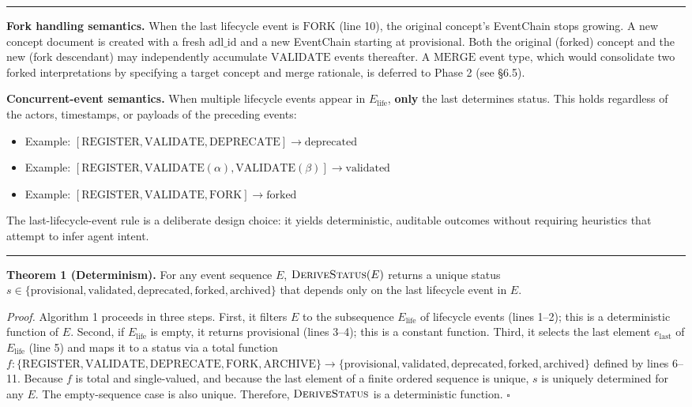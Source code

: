 \begin{center}\rule{0.5\linewidth}{0.5pt}\end{center}

\textbf{Fork handling semantics.} When the last lifecycle event is \(\text{FORK}\) (line 10), the original concept's EventChain stops growing. A new concept document is created with a fresh \(\text{adl\_id}\) and a new EventChain starting at \(\text{provisional}\). Both the original (forked) concept and the new (fork descendant) may independently accumulate \(\text{VALIDATE}\) events thereafter. A \(\text{MERGE}\) event type, which would consolidate two forked interpretations by specifying a target concept and merge rationale, is deferred to Phase 2 (see §6.5).

\textbf{Concurrent-event semantics.} When multiple lifecycle events appear in \(E_{\text{life}}\), \textbf{only} the last determines status. This holds regardless of the actors, timestamps, or payloads of the preceding events:

\begin{itemize}
\tightlist
\item
  Example: \([\text{REGISTER}, \text{VALIDATE}, \text{DEPRECATE}] \rightarrow \text{deprecated}\)
\item
  Example: \([\text{REGISTER}, \text{VALIDATE}(\alpha), \text{VALIDATE}(\beta)] \rightarrow \text{validated}\)
\item
  Example: \([\text{REGISTER}, \text{VALIDATE}, \text{FORK}] \rightarrow \text{forked}\)
\end{itemize}

The last-lifecycle-event rule is a deliberate design choice: it yields deterministic, auditable outcomes without requiring heuristics that attempt to infer agent intent.

\begin{center}\rule{0.5\linewidth}{0.5pt}\end{center}

\textbf{Theorem 1 (Determinism).} For any event sequence \(E\), \(\textsc{DeriveStatus}(E)\) returns a unique status \(s \in \{\text{provisional}, \text{validated}, \text{deprecated}, \text{forked}, \text{archived}\}\) that depends only on the last lifecycle event in \(E\).

\emph{Proof.} Algorithm 1 proceeds in three steps. First, it filters \(E\) to the subsequence \(E_{\text{life}}\) of lifecycle events (lines 1--2); this is a deterministic function of \(E\). Second, if \(E_{\text{life}}\) is empty, it returns \(\text{provisional}\) (lines 3--4); this is a constant function. Third, it selects the last element \(e_{\text{last}}\) of \(E_{\text{life}}\) (line 5) and maps it to a status via a total function \(f : \{\text{REGISTER}, \text{VALIDATE}, \text{DEPRECATE}, \text{FORK}, \text{ARCHIVE}\} \rightarrow \{\text{provisional}, \text{validated}, \text{deprecated}, \text{forked}, \text{archived}\}\) defined by lines 6--11. Because \(f\) is total and single-valued, and because the last element of a finite ordered sequence is unique, \(s\) is uniquely determined for any \(E\). The empty-sequence case is also unique. Therefore, \(\textsc{DeriveStatus}\) is a deterministic function. \(\square\)

